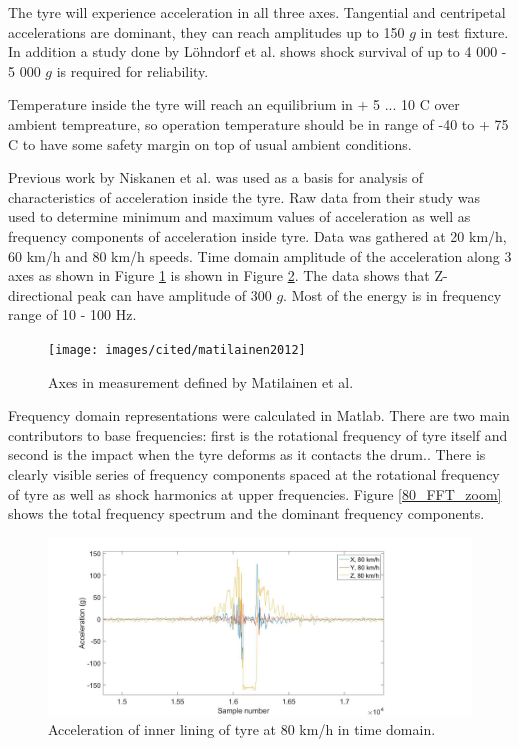 The tyre will experience acceleration in all three axes\cite{Niskanen2014}. Tangential and centripetal accelerations are dominant, they can reach amplitudes up to 150 $g$ in test fixture. In addition a study done by Löhndorf et al. \cite{Lohndorf2007} shows shock survival of up to 4 000 - 5 000 $g$ is required for reliability. 

Temperature inside the tyre will reach an equilibrium in + 5 ... 10 \degree C over ambient tempreature, so operation temperature should be in range of -40 to + 75 \degree C to have some safety margin on top of usual ambient conditions. 

Previous work by Niskanen et al. \cite{Niskanen2014} was used as a basis for analysis of characteristics of acceleration inside the tyre. Raw data from their study was used to determine minimum and maximum values of acceleration as well as frequency components of acceleration inside tyre. Data was gathered at 20 km/h, 60 km/h and 80 km/h speeds. Time domain amplitude of the acceleration along 3 axes as shown in Figure \ref{tyre_axes} is shown in Figure \ref{80_TD}. The data shows that Z-directional peak can have amplitude of 300 $g$. Most of the energy is in frequency range of 10 - 100 Hz.

\begin{figure}[htb]
\begin{center}
\texttt{[image: images/cited/matilainen2012]}
\end{center}
\caption{Axes in measurement defined by Matilainen et al. \cite{Matilainen2012}}
\label{tyre_axes}
\end{figure}

Frequency domain representations were calculated in Matlab. There are two main contributors to base frequencies: first is the rotational frequency of tyre itself and second is the impact when the tyre deforms as it contacts the drum.. There is clearly visible series of frequency components spaced at the rotational frequency of tyre as well as shock harmonics at upper frequencies. Figure \ref{80_FFT_zoom} shows the total frequency spectrum and the dominant frequency components.

\begin{figure}[htb]
\begin{center}
\includegraphics[width=\columnwidth]{images/matlab_figures/80kmh_timedomain_combined}
\end{center}
\caption{Acceleration of inner lining of tyre at 80 km/h in time domain.}
\label{80_TD}
\end{figure}

